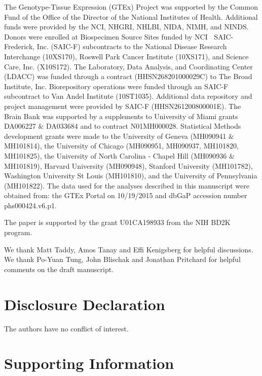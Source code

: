 \documentclass[10pt,letterpaper]{article}
\begin{document}
The Genotype-Tissue Expression (GTEx) Project was supported by the Common Fund of the Office of the Director of the National Institutes of Health. Additional funds were provided by the NCI, NHGRI, NHLBI, NIDA, NIMH, and NINDS. Donors were enrolled at Biospecimen Source Sites funded by NCI $\ $ SAIC-Frederick, Inc. (SAIC-F) subcontracts to the National Disease Research Interchange (10XS170), Roswell Park Cancer Institute (10XS171), and Science Care, Inc. (X10S172). The Laboratory, Data Analysis, and Coordinating Center (LDACC) was funded through a contract (HHSN268201000029C) to The Broad Institute, Inc. Biorepository operations were funded through an SAIC-F subcontract to Van Andel Institute (10ST1035). Additional data repository and project management were provided by SAIC-F (HHSN261200800001E). The Brain Bank was supported by a supplements to University of Miami grants DA006227 $\&$ DA033684 and to contract N01MH000028. Statistical Methods development grants were made to the University of Geneva (MH090941 $\&$ MH101814), the University of Chicago (MH090951, MH090937, MH101820, MH101825), the University of North Carolina - Chapel Hill (MH090936 $\&$ MH101819), Harvard University (MH090948), Stanford University (MH101782), Washington University St Louis (MH101810), and the University of Pennsylvania (MH101822). The data used for the analyses described in this manuscript were obtained from: the GTEx Portal on 10/19/2015 and  dbGaP accession number phs000424.v6.p1.

The paper is supported by the grant U01CA198933 from the NIH BD2K program.

We thank Matt Taddy, Amos Tanay and Effi Kenigsberg for helpful discussions. We thank Po-Yuan Tung, John Blischak and Jonathan Pritchard for helpful comments on the draft manuscript.

\section*{Disclosure Declaration}

The authors have no conflict of interest.

\nolinenumbers



\section*{Supporting Information}
\end{document}
